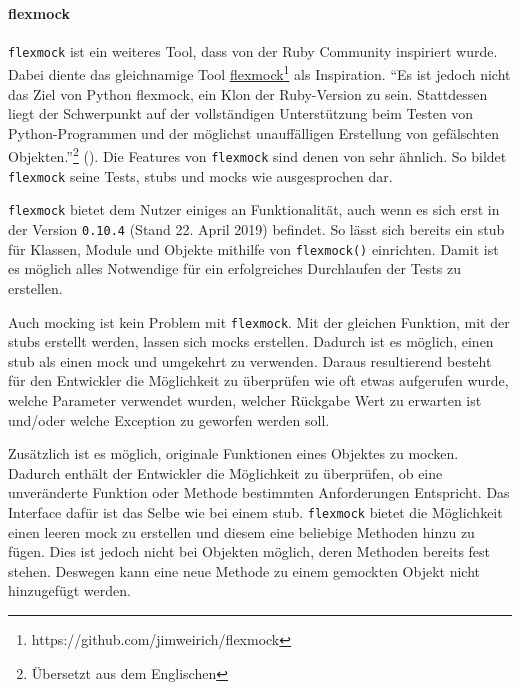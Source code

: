 \paragraph{flexmock}\label{python-tools:flexmock}\mbox{}
\newline
\lstinline{flexmock} ist ein weiteres Tool, dass von der Ruby Community
inspiriert wurde. Dabei diente das gleichnamige Tool
\href{https://github.com/jimweirich/flexmock}{flexmock}\footnote{https://github.com/jimweirich/flexmock}
als Inspiration. "`Es ist jedoch nicht das Ziel von Python flexmock, ein
Klon der Ruby-Version zu sein. Stattdessen liegt der Schwerpunkt auf der
vollständigen Unterstützung beim Testen von Python-Programmen und der möglichst
unauffälligen Erstellung von gefälschten Objekten."'\footnote{Übersetzt aus dem Englischen}
(\cite{flexmock:docs:0.10.3}). Die Features von \lstinline{flexmock} sind denen
von  sehr ähnlich. So bildet \lstinline{flexmock}
seine Tests, \glspl{stub} und \glspl{mock} wie ausgesprochen dar.
\newline

\lstinline{flexmock} bietet dem Nutzer einiges an Funktionalität, auch wenn es
sich erst in der Version \lstinline{0.10.4} (Stand 22. April 2019) befindet. So
lässt sich bereits ein \Gls{stub} für Klassen, Module und Objekte mithilfe von
\lstinline{flexmock()} einrichten. Damit ist es möglich alles Notwendige für
ein erfolgreiches Durchlaufen der Tests zu erstellen.

Auch \gls{mock}ing ist kein Problem mit \lstinline{flexmock}. Mit der gleichen
Funktion, mit der \Glspl{stub} erstellt werden, lassen sich
\Glspl{mock} erstellen. Dadurch ist es möglich, einen \Gls{stub} als einen
\Gls{mock} und umgekehrt zu verwenden. Daraus resultierend besteht für den
Entwickler die Möglichkeit zu überprüfen wie oft etwas aufgerufen wurde, welche
Parameter verwendet wurden, welcher Rückgabe Wert zu erwarten ist und/oder
welche Exception zu geworfen werden soll.

Zusätzlich ist es möglich, originale Funktionen eines Objektes zu
\gls{mock}en. Dadurch enthält der Entwickler die Möglichkeit
zu überprüfen, ob eine unveränderte Funktion oder Methode bestimmten
Anforderungen Entspricht. Das Interface dafür ist das Selbe wie bei einem
\Gls{stub}.
\lstinline{flexmock} bietet die Möglichkeit einen leeren \Gls{mock} zu
erstellen und diesem eine beliebige Methoden hinzu zu fügen. Dies ist jedoch
nicht bei Objekten möglich, deren Methoden bereits fest stehen. Deswegen kann
eine neue Methode zu einem gemockten Objekt nicht hinzugefügt werden.
\newline

